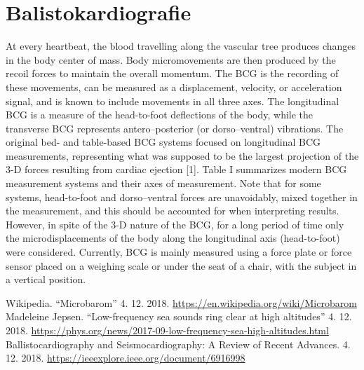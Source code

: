 \documentclass[10pt,a4paper]{article}
\begin{document}
\section{Balistokardiografie}
At every heartbeat, the blood travelling along the vascular tree produces changes in the body center of mass. Body micromovements are then produced by the recoil forces to maintain the overall momentum. The BCG is the recording of these movements, can be measured as a displacement, velocity, or acceleration signal, and is known to include movements in all three axes. The longitudinal BCG is a measure of the head-to-foot deflections of the body, while the transverse BCG represents antero–posterior (or dorso–ventral) vibrations. The original bed- and table-based BCG systems focused on longitudinal BCG measurements, representing what was supposed to be the largest projection of the 3-D forces resulting from cardiac ejection [1]. Table I summarizes modern BCG measurement systems and their axes of measurement. Note that for some systems, head-to-foot and dorso–ventral forces are unavoidably, mixed together in the measurement, and this should be accounted for when interpreting results. However, in spite of the 3-D nature of the BCG, for a long period of time only the microdisplacements of the body along the longitudinal axis (head-to-foot) were considered. Currently, BCG is mainly measured using a force plate or force sensor placed on a weighing scale or under the seat of a chair, with the subject in a vertical position.
\begin{thebibliography}{Mm99}
     Wikipedia. “Microbarom” 4. 12. 2018. \url{https://en.wikipedia.org/wiki/Microbarom}
     Madeleine Jepsen. “Low-frequency sea sounds ring clear at high altitudes” 4. 12. 2018. \url{https://phys.org/news/2017-09-low-frequency-sea-high-altitudes.html}
     Ballistocardiography and Seismocardiography: A Review of Recent Advances. 4. 12. 2018. \url{https://ieeexplore.ieee.org/document/6916998}
\end{thebibliography}
\end{document}
